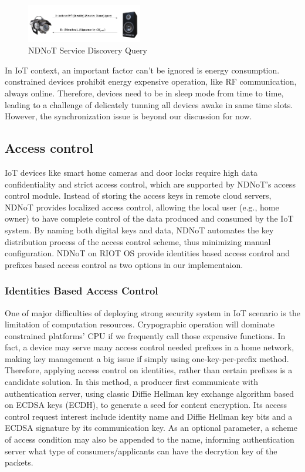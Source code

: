 \documentclass[sigconf]{acmart}
\begin{document}
\begin{figure}[h]
	\vspace{-0.1cm}
	\centering
	\includegraphics[width=0.45\textwidth]{figures/service-discovery-query}
	\caption{NDNoT Service Discovery Query}	\vspace{-0.1cm}
	\label{fig:servicediscovery-query}
\end{figure}

In IoT context, an important factor can't be ignored is energy consumption. constrained devices prohibit energy expensive operation, like RF communication, always online. 
Therefore, devices need to be in sleep mode from time to time, leading to a challenge of delicately tunning all devices awake in same time slots. However, the synchronization 
issue is beyond our discussion for now. 

\subsection{Access control}
IoT devices like smart home cameras and door locks require high data confidentiality and strict access control, which are supported by NDNoT's access control module.
Instead of storing the access keys in remote cloud servers, NDNoT provides localized access control, allowing the local user (e.g., home owner) to have complete control of the data produced and consumed by the IoT system.
By naming both digital keys and data, NDNoT automates the key distribution process of the access control scheme, thus minimizing manual configuration.
NDNoT on RIOT OS provide identities based access control and prefixes based access control as two options in our implementaion. 

\subsubsection{Identities Based Access Control}

One of major difficulties of deploying strong security system in IoT scenario is the limitation of computation resources. Crypographic operation will dominate constrained platforms' CPU if we frequently call those expensive 
functions. In fact, a device may serve many access control needed prefixes in a home network, making key management a big issue if simply using one-key-per-prefix method. Therefore, applying access control on identities, rather than 
certain prefixes is a candidate solution. In this method, a producer first communicate with authentication server, using classic Diffie Hellman key exchange algorithm based on ECDSA keys (ECDH), to generate a seed for content encryption.
Its access control request interest include identity name and Diffie Hellman key bits and a ECDSA signature by its communication key. As an optional parameter, a scheme of access condition may also 
be appended to the name, informing authentication server what type of consumers/applicants can have the decrytion key of the packets.
\end{document}
